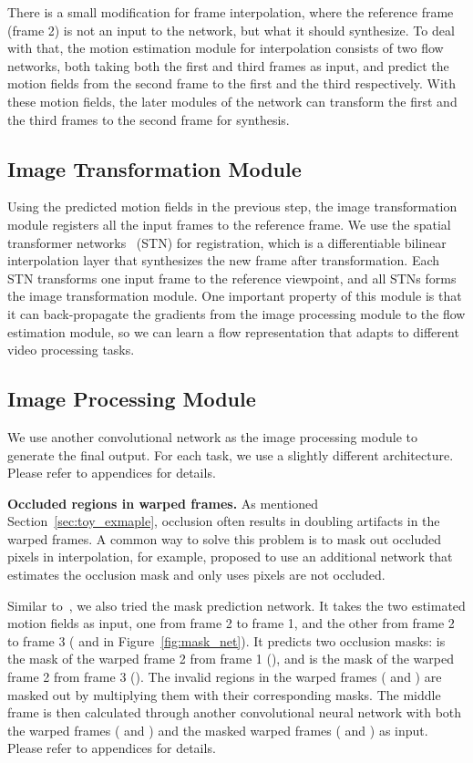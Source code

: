 \documentclass[twocolumn,natbib]{svjour3}          \smartqed  \usepackage{graphicx}
\newcommand{\sect}[1]{Section~\ref{#1}}
\newcommand{\fig}[1]{Figure~\ref{#1}}
\newcommand{\myparagraph}[1]{\vspace{5pt}\noindent\textbf{#1}}
\begin{document}
There is a small modification for frame interpolation, where the reference frame (frame 2) is not an input to the network, but what it should synthesize. To deal with that, the motion estimation module for interpolation consists of two flow networks, both taking both the first and third frames as input, and predict the motion fields from the second frame to the first and the third respectively. With these motion fields, the later modules of the network can transform the first and the third frames to the second frame for synthesis.

\subsection{Image Transformation Module}
\label{sect:stn}


Using the predicted motion fields in the previous step, the image transformation module registers all the input frames to the reference frame. We use the spatial transformer networks~\citep{Jaderberg2015Spatial} (STN) for registration, which is a differentiable bilinear interpolation layer that synthesizes the new frame after transformation. Each STN transforms one input frame to the reference viewpoint, and all  STNs forms the image transformation module. One important property of this module is that it can back-propagate the gradients from the image processing module to the flow estimation module, so we can learn a flow representation that adapts to different video processing tasks.

\subsection{Image Processing Module}
\label{sect:improc_net}

We use another convolutional network as the image processing module to generate the final output. 
For each task, we use a slightly different architecture. Please refer to appendices for details.

\myparagraph{Occluded regions in warped frames. } As mentioned \sect{sec:toy_exmaple}, occlusion often results in doubling artifacts in the warped frames. 
A common way to solve this problem is to mask out occluded pixels in interpolation, for example, \cite{Liu2017Video} proposed to use an additional network that estimates the occlusion mask and only uses pixels are not occluded. 

Similar to~\cite{Liu2017Video}, we also tried the mask prediction network. It takes the two estimated motion fields as input, one from frame 2 to frame 1, and the other from frame 2 to frame 3 ( and  in \fig{fig:mask_net}). It predicts two occlusion masks:  is the mask of the warped frame 2 from frame 1 (), and  is the mask of the warped frame 2 from frame 3 (). The invalid regions in the warped frames ( and ) are masked out by multiplying them with their corresponding masks. The middle frame is then calculated through another convolutional neural network with both the warped frames ( and ) and the masked warped frames ( and ) as input. Please refer to appendices for details.
\end{document}
